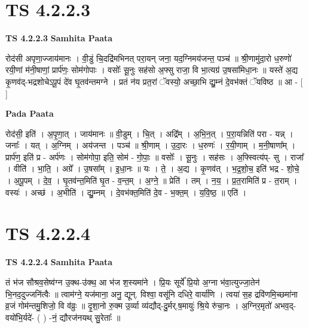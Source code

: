\documentclass[17pt]{extarticle}
\begin{document}

\section{ TS 4.2.2.3 }

\textbf{TS 4.2.2.3 } \newline
\textbf{Samhita Paata} \newline

रोद॑सी अपृणा॒ज्जाय॑मानः । वी॒डुं चि॒दद्रि॑मभिनत् परा॒यन् जना॒ यद॒ग्निमय॑जन्त॒ पञ्च॑ ॥ श्री॒णामु॑दा॒रो ध॒रुणो॑ रयी॒णां म॑नी॒षाणां॒ प्रार्प॑णः॒ सोम॑गोपाः । वसोः᳚ सू॒नुः सह॑सो अ॒फ्सु राजा॒ वि भा॒त्यग्र॑ उ॒षसा॑मिधा॒नः ॥ यस्ते॑ अ॒द्य कृ॒णव॑द्-भद्रशोचेऽपू॒पं दे॑व घृ॒तव॑न्तमग्ने । प्रतं न॑य प्रत॒रां ॅवस्यो॒ अच्छा॒भि द्यु॒म्नं दे॒वभ॑क्तं ॅयविष्ठ ॥ आ - [  ] \newline

\textbf{Pada Paata} \newline

रोद॑सी॒ इति॑ । अ॒पृ॒णा॒त् । जाय॑मानः ॥ वी॒डुम् । चि॒त् । अद्रि᳚म् । अ॒भि॒न॒त् । प॒रा॒यन्निति॑ परा - यन्न् । जनाः᳚ । यत् । अ॒ग्निम् । अय॑जन्त । पञ्च॑ ॥ श्री॒णाम् । उ॒दा॒रः । ध॒रुणः॑ । र॒यी॒णाम् । म॒नी॒षाणा᳚म् । प्रार्प॑ण॒ इति॑ प्र - अर्प॑णः । सोम॑गोपा॒ इति॒ सोम॑ - गो॒पाः॒ ॥ वसोः᳚ । सू॒नुः । सह॑सः । अ॒फ्स्वित्य॑प्- सु । राजा᳚ । वीति॑ । भा॒ति॒ । अग्रे᳚ । उ॒षसा᳚म् । इ॒धा॒नः ॥ यः । ते॒ । अ॒द्य । कृ॒णव॑त् । भ॒द्र॒शो॒च॒ इति॑ भद्र - शो॒चे॒ । अ॒पू॒पम् । दे॒व॒ । घृ॒तव॑न्त॒मिति॑ घृ॒त - व॒न्त॒म् । अ॒ग्ने॒ ॥ प्रेति॑ । तम् । न॒य॒ । प्र॒त॒रामिति॑ प्र - त॒राम् । वस्यः॑ । अच्छ॑ । अ॒भीति॑ । द्यु॒म्नम् । दे॒वभ॑क्त॒मिति॑ दे॒व - भ॒क्त॒म् । य॒वि॒ष्ठ॒ ॥ एति॑ ।  \newline





\section{ TS 4.2.2.4 }

\textbf{TS 4.2.2.4 } \newline
\textbf{Samhita Paata} \newline

तं भ॑ज सौश्रव॒सेष्व॑ग्न उ॒क्थ-उ॑क्थ॒ आ भ॑ज श॒स्यमा॑ने । प्रि॒यः सूर्ये᳚ प्रि॒यो अ॒ग्ना भ॑वा॒त्युज्जा॒तेन॑ भि॒नद॒दुज्जनि॑त्वैः ॥ त्वाम॑ग्ने॒ यज॑माना॒ अनु॒ द्यून्. विश्वा॒ वसू॑नि दधिरे॒ वार्या॑णि । त्वया॑ स॒ह द्रवि॑णमि॒च्छमा॑ना व्र॒जं गोम॑न्तमु॒शिजो॒ वि व॑व्रुः ॥ दृ॒शा॒नो रु॒क्म उ॒र्व्या व्य॑द्यौद्-दु॒र्मर्.ष॒मायुः॑ श्रि॒ये रु॑चा॒नः । अ॒ग्निर॒मृतो॑ अभव॒द्-वयो॑भि॒र्यदे॑- ( ) -नं॒ द्यौरज॑नयथ् सु॒रेताः᳚ ॥ \newline
\end{document}
